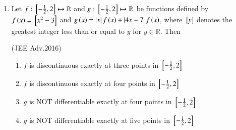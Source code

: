 \documentclass[journal]{IEEEtran}
\numberwithin{equation}{enumi}
\numberwithin{figure}{enumi}
\begin{document}
\begin{enumerate}
    \item 
	    Let $f:{}\left[-\frac{1}{2}, 2\right]\mapsto \mathbb{R}$ and $g:{}\left[-\frac{1}{2}, 2\right]\mapsto \mathbb{R}$ be functions defined by $f\left(x\right)={}\left[x^2-3\right]$ and $g\left(x\right)=\left\vert x\right\vert f\left(x\right)+\left\vert4x-7\right\vert f\left(x\right)$, where ${}\left[y\right]$ denotes the greatest integer less than or equal to $y$ for $y\in \mathbb{R}$. Then 

    \hfill(JEE Adv.2016)
    
    \begin{enumerate}        
        \item $f$ is discontinuous exactly at three points in ${}\left[-\frac{1}{2}, 2\right]$
        \item $f$ is discontinuous exactly at four points in ${}\left[-\frac{1}{2}, 2\right]$
        \item $g$ is NOT differentiable exactly at four points in ${}\left[-\frac{1}{2}, 2\right]$
        \item $g$ is NOT differentiable exactly at five points in ${}\left[-\frac{1}{2}, 2\right]$
    \end{enumerate}

\end{enumerate}
\end{document}
